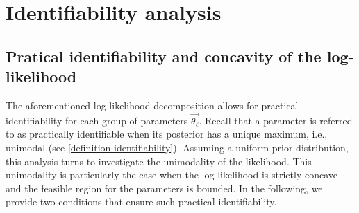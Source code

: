 \documentclass[pdflatex,sn-mathphys-num]{sn-jnl}%
\def\dd{\text{d}}
\theoremstyle{thmstyleone}%
\theoremstyle{thmstyletwo}%
\theoremstyle{thmstylethree}%
\begin{document}

\section{Identifiability analysis}\label{section identifiability analysis}


\subsection{Pratical identifiability and concavity of the log-likelihood}

The aforementioned log-likelihood decomposition allows for practical identifiability for each group of parameters $\overrightarrow{\theta_\ell}$.
Recall that a parameter is referred to as practically identifiable when its posterior has a unique maximum, i.e., unimodal (see \ref{definition identifiability}). 
Assuming a uniform prior distribution, this analysis turns to investigate the unimodality of the likelihood. 
This unimodality is particularly the case when the log-likelihood is strictly concave and the feasible region for the parameters is bounded.
In the following, we provide two conditions that ensure such practical identifiability.

\medskip
\end{document}

